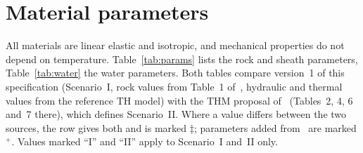 \documentclass[11pt,a4paper]{article}
\newcommand{\incons}{\textcolor{red!70!black}{$\ddagger$}}
\newcommand{\added}{\textcolor{blue!60!black}{$^{+}$}}
\begin{document}
\section{Material parameters}
\label{sec:materials}
All materials are linear elastic and isotropic, and mechanical properties do
not depend on temperature. Table~\ref{tab:params} lists the rock and sheath
parameters, Table~\ref{tab:water} the water parameters. Both tables compare
version~1 of this specification (Scenario~I, rock values from Table~1
of~\cite{Mollaali2026}, hydraulic and thermal values from the reference TH
model) with the THM proposal of~\cite{Pan2026} (Tables~2, 4, 6 and~7 there),
which defines Scenario~II. Where a value differs between the two sources, the
row gives both and is marked \incons; parameters added from~\cite{Pan2026} are
marked \added. Values marked ``I'' and ``II'' apply to Scenario~I and~II only.
\end{document}
